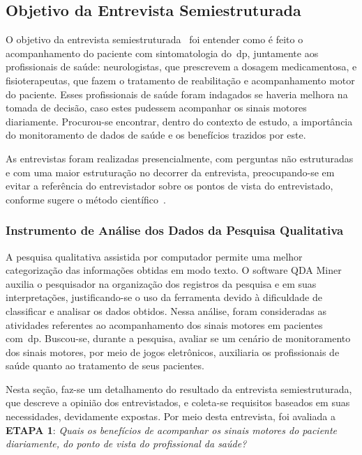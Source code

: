 \subsection{Objetivo da Entrevista Semiestruturada}
O objetivo da entrevista semiestruturada~\cite{FLI04} foi entender como é feito o acompanhamento do paciente com sintomatologia do~\ac{dp}, juntamente aos profissionais de saúde: neurologistas, que prescrevem a dosagem medicamentosa, e fisioterapeutas, que fazem o tratamento de reabilitação e acompanhamento motor do paciente. Esses profissionais de saúde foram indagados se haveria melhora na tomada de decisão, caso estes pudessem acompanhar os sinais motores diariamente. Procurou-se encontrar, dentro do contexto de estudo, a importância do monitoramento de dados de saúde e os benefícios trazidos por este.

As entrevistas foram realizadas presencialmente, com perguntas não estruturadas e com uma maior estruturação no decorrer da entrevista, preocupando-se em evitar a referência do entrevistador sobre os pontos de vista do entrevistado, conforme sugere o método científico~\cite{FLI04}. 

\subsubsection{Instrumento de Análise dos Dados da Pesquisa Qualitativa} \label{section:analise_dados} 
A pesquisa qualitativa assistida por computador permite uma melhor categorização das informações obtidas em modo texto. O software QDA Miner~\cite{qda13} auxilia o pesquisador na organização dos registros da pesquisa e em suas interpretações, justificando-se o uso da ferramenta devido à dificuldade de classificar e analisar os dados obtidos. Nessa análise, foram consideradas as atividades referentes ao acompanhamento dos sinais motores em pacientes com~\ac{dp}. Buscou-se, durante a pesquisa, avaliar se um cenário de monitoramento dos sinais motores, por meio de jogos eletrônicos, auxiliaria os profissionais de saúde quanto ao tratamento de seus pacientes.

Nesta seção, faz-se um detalhamento do resultado da entrevista semiestruturada, que descreve a opinião dos entrevistados, e coleta-se requisitos baseados em suas necessidades, devidamente expostas. Por meio desta entrevista, foi avaliada a \textbf{ETAPA 1}: \textit{Quais os benefícios de acompanhar os sinais motores do paciente diariamente, do ponto de vista do profissional da saúde?}




